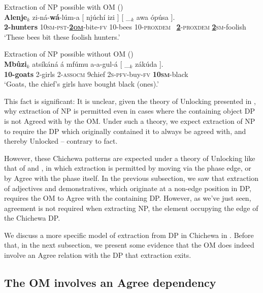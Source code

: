 \documentclass[output=paper,colorlinks,citecolor=brown]{langscibook}
\begin{document}
\ea%
    \label{ex:branan:9}
    Extraction of NP possible with OM \hfill{(\citealt[50, ex. 16c]{Mchombo2004})}\\
    \gll    \textbf{Alenje}$_{k}$  zi-n\'{a}-\textbf{w\'{a}}-l\'{u}m-a [ nj\'{u}ch\'{i} izi ] [ \_$_{k}$  awa \'{o}p\'{u}sa ]. \\
            \textbf{2-hunters} 10\textsc{sm-pst}-\textbf{\underline{2\textsc{om}}}-bite-\textsc{fv} {} 10-bees 10-\textsc{proxdem} {} {} \, \underline{\textbf{2}}-\textsc{proxdem} \underline{\textbf{2}}\textsc{sm}-foolish \\
    \glt    `These bees bit these foolish hunters.'
\z

\ea%
    \label{ex:branan:10}
    Extraction of NP possible without OM \hfill{(\citealt[ex. 4]{Mchombo2006})}\\
    \gll    \textbf{Mb\^{u}zi}$_{k}$ ats\'{i}k\'{a}n\'{a} \'{a} mf\'{u}mu a-a-gul-\'{a} [ \_$_{k}$ z\'{a}k\'{u}da ]. \\
            \textbf{10-goats} 2-girls 2-\textsc{assocm} 9chief 2\textsc{s-pfv}-buy-\textsc{fv} {} {} \textbf{10\textsc{sm}}-black   \\
    \glt    `Goats, the chief's girls have bought black (ones).'
\z

This fact is significant: It is unclear, given the theory of Unlocking presented in \citet{VanUrkRichards2015}, why extraction of NP is permitted even in cases where the containing object DP is not Agreed with by the OM. Under such a theory, we expect extraction of NP to require the DP which originally contained it to always be agreed with, and thereby Unlocked -- contrary to fact.

However, these Chichewa patterns are expected under a theory of Unlocking like that of \citet{RackowskiRichards2005} and \citet{Branan2018}, in which extraction is permitted by moving via the phase edge, or by Agree with the phase itself. In the previous subsection, we saw that extraction of adjectives and demonstratives, which originate at a non-edge position in DP, requires the OM to Agree with the containing DP. However, as we've just seen, agreement is not required when extracting NP, the element occupying the edge of the Chichewa DP.

We discuss a more specific model of extraction from DP in Chichewa in . Before that, in the next subsection, we present some evidence that the OM does indeed involve an Agree relation with the DP that extraction exits.

\subsection{The OM involves an Agree dependency}\label{sec:branan:3.3}
\end{document}
